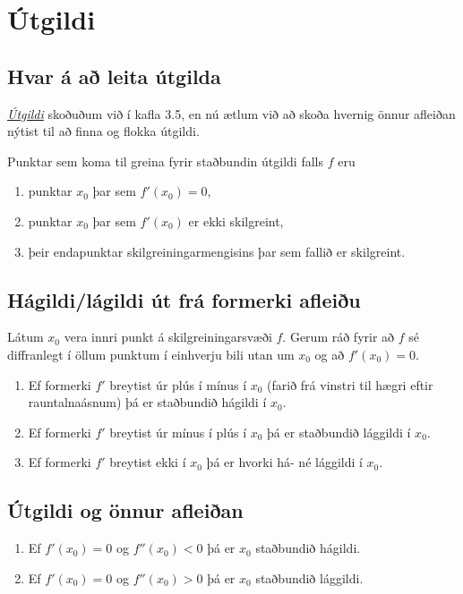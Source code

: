 \documentclass[a4paper,10pt,icelandic]{sphinxmanual}
\begin{document}
\section{Útgildi}
\label{kafli05:index-3}\label{kafli05:utgildi}

\subsection{Hvar á að leita útgilda}
\label{kafli05:hvar-a-a-leita-utgilda}
{\hyperref[kafli03:utgildi]{\emph{Útgildi}}}  skoðuðum við í kafla 3.5, en nú ætlum við að skoða
hvernig önnur afleiðan nýtist til að finna og flokka útgildi.

Punktar sem koma til greina fyrir staðbundin útgildi falls \(f\) eru
\begin{enumerate}
\item {} 
punktar \(x_0\) þar sem \(f'(x_0)=0\),

\item {} 
punktar \(x_0\) þar sem \(f'(x_0)\) er ekki skilgreint,

\item {} 
þeir endapunktar skilgreiningarmengisins þar sem fallið er
skilgreint.

\end{enumerate}


\subsection{Hágildi/lágildi út frá formerki afleiðu}
\label{kafli05:hagildi-lagildi-ut-fra-formerki-afleiu}
Látum \(x_0\) vera innri punkt á skilgreiningarsvæði \(f\).
Gerum ráð fyrir að \(f\) sé diffranlegt í öllum punktum í einhverju
bili utan um \(x_0\) og að \(f'(x_0)=0\).
\begin{enumerate}
\item {} 
Ef formerki \(f'\) breytist úr plús í mínus í \(x_0\)
(farið frá vinstri til hægri eftir rauntalnaásnum) þá er
staðbundið hágildi í \(x_0\).

\item {} 
Ef formerki \(f'\) breytist úr mínus í plús í \(x_0\) þá
er staðbundið lággildi í \(x_0\).

\item {} 
Ef formerki \(f'\) breytist ekki í \(x_0\) þá er hvorki
há- né lággildi í \(x_0\).

\end{enumerate}


\subsection{Útgildi og önnur afleiðan}
\label{kafli05:utgildi-og-onnur-afleian}\begin{enumerate}
\item {} 
Ef \(f'(x_0)=0\) og \(f''(x_0)<0\) þá er \(x_0\)
staðbundið hágildi.

\item {} 
Ef \(f'(x_0)=0\) og \(f''(x_0)>0\) þá er \(x_0\)
staðbundið lággildi.

\end{enumerate}
\end{document}
